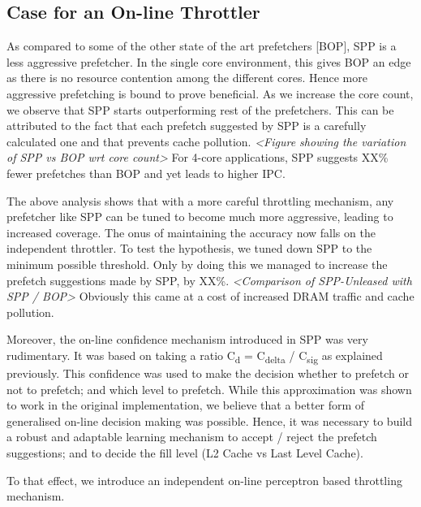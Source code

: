 \subsection{Case for an On-line Throttler}
\label{Background-Case}
As compared to some of the other state of the art prefetchers [BOP],
SPP is a less aggressive prefetcher.  In the single core
environment, this gives BOP an edge as there is no resource contention
among the different cores.  Hence more aggressive prefetching is bound
to prove beneficial.  As we increase the core count, we observe that
SPP starts outperforming rest of the prefetchers.  This can be
attributed to the fact that each prefetch suggested by SPP is a
carefully calculated one and that prevents cache pollution.
\textit{<Figure showing the variation of SPP vs BOP wrt core count>}
For 4-core applications, SPP suggests XX\% fewer prefetches than BOP
and yet leads to higher IPC.

The above analysis shows that with a more careful throttling
mechanism, any prefetcher like SPP can be tuned to become much more aggressive, leading to
increased coverage.  The onus of maintaining the accuracy now falls on
the independent throttler.  To test the hypothesis, we tuned down SPP
to the minimum possible threshold.  Only by doing this we managed to
increase the prefetch suggestions made by SPP, by XX\%.
\textit{<Comparison of SPP-Unleased with SPP / BOP>} Obviously this
came at a cost of increased DRAM traffic and cache pollution.

Moreover, the on-line confidence mechanism introduced in SPP was very
rudimentary.  It was based on taking a ratio C\textsubscript{d} =
C\textsubscript{delta} / C\textsubscript{sig} as explained previously. This 
confidence was used to make the decision whether to prefetch or
not to prefetch; and which level to prefetch.  While this
approximation was shown to work in the original implementation, we believe that a
better form of generalised on-line decision making was possible.  
Hence, it was
necessary to build a robust and adaptable learning mechanism to accept
/ reject the prefetch suggestions; and to decide the fill level (L2
Cache vs Last Level Cache).

To that effect, we introduce an independent on-line perceptron based throttling mechanism.
